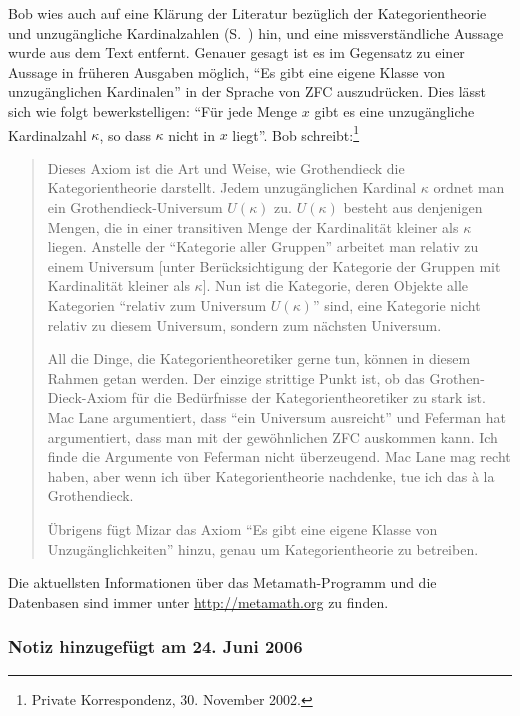 Bob wies auch auf eine Klärung der Literatur bezüglich der Kategorientheorie und unzugängliche Kardinalzahlen (S.~\pageref{categoryth}) hin, und eine missverständliche Aussage wurde aus dem Text entfernt.  Genauer gesagt ist es im Gegensatz zu einer Aussage in früheren Ausgaben möglich, "`Es gibt eine eigene Klasse von unzugänglichen Kardinalen"' in der Sprache von ZFC auszudrücken.  Dies lässt sich wie folgt bewerkstelligen:  "`Für jede Menge $x$ gibt es eine unzugängliche Kardinalzahl $\kappa$, so dass $\kappa$ nicht in $x$ liegt"'. Bob schreibt:\footnote{Private Korrespondenz, 30. November 2002.}
\begin{quotation}

  Dieses Axiom ist die Art und Weise, wie Grothendieck die Kategorientheorie darstellt.  Jedem unzugänglichen Kardinal $\kappa$ ordnet man ein Grothendieck-Universum  $U(\kappa)$ zu. $U(\kappa)$ besteht aus denjenigen Mengen, die in einer transitiven Menge der Kardinalität kleiner als $\kappa$ liegen.  Anstelle der "`Kategorie aller Gruppen"' arbeitet man relativ zu einem Universum [unter Berücksichtigung der Kategorie der Gruppen mit Kardinalität kleiner als $\kappa$].  Nun ist die Kategorie, deren Objekte alle Kategorien "`relativ zum Universum $U(\kappa)$"' sind, eine Kategorie nicht relativ zu diesem Universum, sondern zum nächsten Universum.

  All die Dinge, die Kategorientheoretiker gerne tun, können in diesem Rahmen getan werden.  Der einzige strittige Punkt ist, ob das Grothen-Dieck-Axiom für die Bedürfnisse der Kategorientheoretiker zu stark ist.  Mac Lane  argumentiert, dass "`ein Universum ausreicht"' und Feferman hat argumentiert, dass man mit der gewöhnlichen ZFC auskommen kann.  Ich finde die Argumente von Feferman nicht überzeugend.  Mac Lane mag recht haben, aber wenn ich über Kategorientheorie nachdenke, tue ich das \`{a} la Grothendieck.

  Übrigens fügt Mizar das Axiom "`Es gibt eine eigene Klasse von Unzugänglichkeiten"' hinzu, genau um Kategorientheorie zu betreiben.

\end{quotation}

Die aktuellsten Informationen über das Metamath-Programm und die Datenbasen sind immer unter \url{http://metamath.org} zu finden.


\subsubsection{Notiz hinzugefügt am 24. Juni 2006}\label{note2006}

